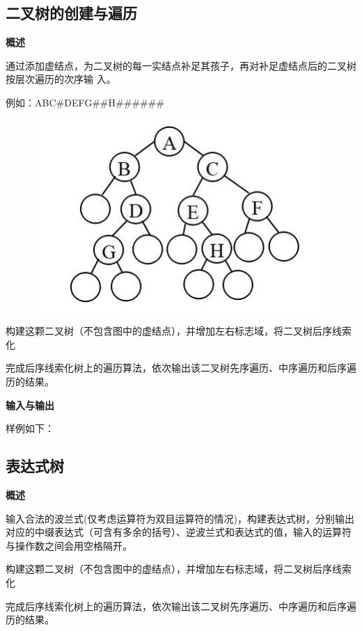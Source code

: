 \documentclass[UTF8]{article}
\begin{document}
	\subsection{二叉树的创建与遍历}
	\textbf{概述}\par
	通过添加虚结点，为二叉树的每一实结点补足其孩子，再对补足虚结点后的二叉树按层次遍历的次序输
	入。\par
	例如：ABC\#DEFG\#\#H\#\#\#\#\#\#\par
	\begin{figure}[H]
		\centering
		\includegraphics[width=0.6\linewidth]{sampleTree.jpg}
		\label{sampleTree}
	\end{figure}\par
	构建这颗二叉树（不包含图中的虚结点），并增加左右标志域，将二叉树后序线索化\par
	完成后序线索化树上的遍历算法，依次输出该二叉树先序遍历、中序遍历和后序遍历的结果。\par
	
	\textbf{输入与输出}\par
	样例如下：\par
	\par
	
	\subsection{表达式树}
	\textbf{概述}\par
	输入合法的波兰式(仅考虑运算符为双目运算符的情况)，构建表达式树，分别输出对应的中缀表达式（可含有多余的括号）、逆波兰式和表达式的值，输入的运算符与操作数之间会用空格隔开。\par
	构建这颗二叉树（不包含图中的虚结点），并增加左右标志域，将二叉树后序线索化\par
	完成后序线索化树上的遍历算法，依次输出该二叉树先序遍历、中序遍历和后序遍历的结果。\par
	
\end{document}
